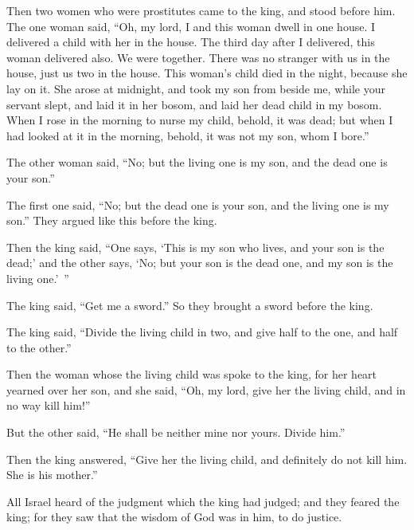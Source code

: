 {\par }{\PP {}Then two women who were prostitutes came to the king, and stood before him.
The one woman said, “Oh, my lord, I and this woman dwell in one house. I delivered a child with her in the house.
The third day after I delivered, this woman delivered also. We were together. There was no stranger with us in the house, just us two in the house.
This woman’s child died in the night, because she lay on it.
She arose at midnight, and took my son from beside me, while your servant slept, and laid it in her bosom, and laid her dead child in my bosom.
When I rose in the morning to nurse my child, behold, it was dead; but when I had looked at it in the morning, behold, it was not my son, whom I bore.”
\par }{\PP {}The other woman said, “No; but the living one is my son, and the dead one is your son.”
\par }{\PP The first one said, “No; but the dead one is your son, and the living one is my son.” They argued like this before the king.
\par }{\PP {}Then the king said, “One says, ‘This is my son who lives, and your son is the dead;’ and the other says, ‘No; but your son is the dead one, and my son is the living one.’ ”
\par }{\PP {}The king said, “Get me a sword.” So they brought a sword before the king.
\par }{\PP {}The king said, “Divide the living child in two, and give half to the one, and half to the other.”
\par }{\PP {}Then the woman whose the living child was spoke to the king, for her heart yearned over her son, and she said, “Oh, my lord, give her the living child, and in no way kill him!”
\par }{\PP But the other said, “He shall be neither mine nor yours. Divide him.”
\par }{\PP {}Then the king answered, “Give her the living child, and definitely do not kill him. She is his mother.”
\par }{\PP {}All Israel heard of the judgment which the king had judged; and they feared the king; for they saw that the wisdom of God was in him, to do justice.

}
